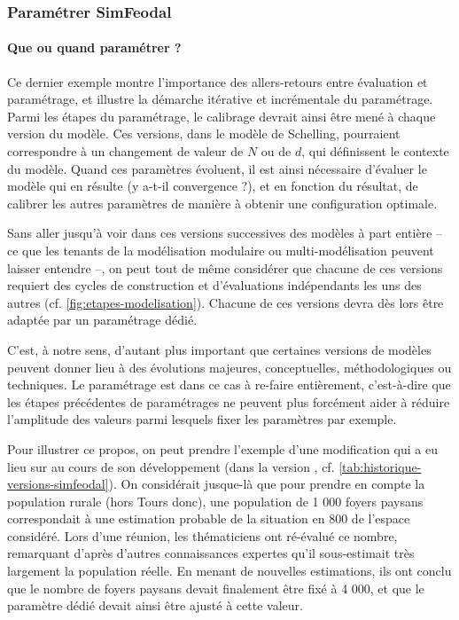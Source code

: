 \subsubsection{Paramétrer SimFeodal \label{subsubsec:parametrage-simfeodal}}

\paragraph{Que ou quand paramétrer ?} \label{sssec:parametrer-un-des-modeles}

Ce dernier exemple montre l'importance des allers-retours entre évaluation et paramétrage, et illustre la démarche itérative et incrémentale du paramétrage.
Parmi les étapes du paramétrage, le calibrage devrait ainsi être mené à chaque \og version\fg{} du modèle.
Ces versions, dans le modèle de Schelling, pourraient correspondre à un changement de valeur de $N$ ou de $d$, qui définissent le contexte du modèle.
Quand ces paramètres évoluent, il est ainsi nécessaire d'évaluer le modèle qui en résulte (y a-t-il convergence ?), et en fonction du résultat, de calibrer les autres paramètres de manière à obtenir une configuration optimale.

Sans aller jusqu'à voir dans ces versions successives des modèles à part entière -- ce que les tenants de la modélisation modulaire \autocite{grimm_pattern-oriented_2005,grimm_pattern-oriented_2012} ou multi-modélisation \autocite{pumain_chapter_2017} peuvent laisser entendre --, on peut tout de même considérer que chacune de ces versions requiert des cycles de construction et d'évaluations indépendants les uns des autres (cf. \cref{fig:etapes-modelisation}).
Chacune de ces versions devra dès lors être adaptée par un paramétrage dédié.

C'est, à notre sens, d'autant plus important que certaines versions de modèles peuvent donner lieu à des évolutions majeures, conceptuelles, méthodologiques ou techniques.
Le paramétrage est dans ce cas à \og re-faire\fg{} entièrement, c'est-à-dire que les étapes précédentes de paramétrages ne peuvent plus forcément aider à réduire l'amplitude des valeurs parmi lesquels fixer les paramètres par exemple.

Pour illustrer ce propos, on peut prendre l'exemple d'une modification qui a eu lieu sur \simfeodal{} au cours de son développement (dans la version \fg{}, cf. \cref{tab:historique-versions-simfeodal}).
On considérait jusque-là que pour prendre en compte la population rurale (hors Tours donc), une population de 1 000 foyers paysans correspondait à une estimation probable de la situation en 800 de l'espace considéré.
Lors d'une réunion, les thématiciens ont ré-évalué ce nombre, remarquant d'après d'autres connaissances expertes qu'il sous-estimait très largement la population réelle.
En menant de nouvelles estimations, ils ont conclu que le nombre de foyers paysans devait finalement être fixé à 4 000, et que le paramètre dédié devait ainsi être ajusté à cette valeur.

